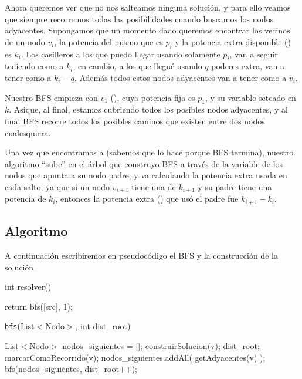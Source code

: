 Ahora queremos ver que no nos salteamos ninguna soluci\'on, y para ello veamos que siempre recorremos todas las posibilidades cuando buscamos los nodos adyacentes. Supongamos que un momento dado queremos encontrar los vecinos de un nodo $v_i$, la potencia del mismo que es $p_i$ y la potencia extra disponible () es $k_i$. Los casilleros a los que puedo llegar usando solamente $p_i$, van a seguir teniendo como  a $k_i$, en cambio, a los que llegu\'e usando $q$ poderes extra, van a tener como  a $k_i-q$. Adem\'as todos estos nodos adyacentes van a tener como  a $v_i$. 

Nuestro BFS empieza con $v_1$ (), cuya potencia fija es $p_1$, y su variable  seteado en $k$. Asique, al final, estamos cubriendo todos los posibles nodos adyacentes, y al final BFS recorre todos los posibles caminos que existen entre dos nodos cualesquiera. 

Una vez que encontramos a  (sabemos que lo hace porque BFS termina), nuestro algoritmo ``sube'' en el \'arbol que construyo BFS a trav\'es de la variable de los nodos  que apunta a su nodo padre, y va calculando la potencia extra usada en cada salto, ya que si un nodo $v_{i+1}$ tiene una  de $k_{i+1}$ y su padre tiene una potencia de $k_i$, entonces la potencia extra () que us\'o el padre fue $k_{i+1} - k_i$.

\subsection{Algoritmo}

A continuaci\'on escribiremos en pseudoc\'odigo el BFS y la construcci\'on de la soluci\'on

\begin{algorithm}[H]
\caption{int resolver()}
\begin{algorithmic}[1]
  \STATE return bfs([src], 1);
\end{algorithmic}
\end{algorithm}

\begin{algorithm}[H]
\caption{\texttt{bfs}(List$<$Nodo$>$, int dist\_root)}
\begin{algorithmic}[1]
  \STATE List$<$Nodo$>$ nodos\_siguientes = [];
        \STATE construirSolucion(v);
        \RETURN dist\_root;
      \ELSE
        \STATE marcarComoRecorrido(v);
        \STATE nodos\_siguientes.addAll( getAdyacentes(v) );
      \ENDIF
    \ENDIF
  \ENDFOR
  \RETURN bfs(nodos\_siguientes, dist\_root++);
\end{algorithmic}
\end{algorithm}

